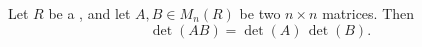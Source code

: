 \begin{proposition} \label{proposition:determinant_of_product_equals_product_of_determinants_over_a_commutative_ring}
    Let $R$ be a , and let $A, B \in M_n(R)$ be two $n \times n$ matrices. Then
    $$\det(AB) = \det(A)\,\det(B).$$
\end{proposition}